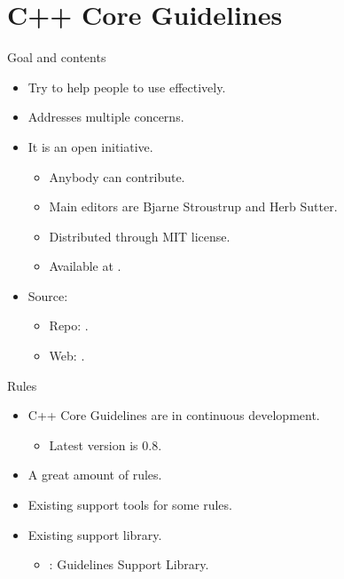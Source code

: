 \section{C++ Core Guidelines}

\begin{frame}[t]{Goal and contents}
\begin{itemize}
  \item Try to help people to use  effectively.

  \vfill
  \item Addresses multiple concerns.

  \vfill
  \item It is an open initiative.
    \begin{itemize}
      \item Anybody can contribute.
      \item Main editors are Bjarne Stroustrup and Herb Sutter.
      \item Distributed through MIT license.
      \item Available at .
    \end{itemize}

  \vfill
  \item Source:
    \begin{itemize}
      \item Repo: .
      \item Web: .
    \end{itemize}
\end{itemize}
\end{frame}

\begin{frame}[t]{Rules}
\begin{itemize}
  \item C++ Core Guidelines are in continuous development.
    \begin{itemize}
      \item Latest version is 0.8.
    \end{itemize}

  \vfill
  \item A great amount of rules.

  \vfill
  \item Existing support tools for some rules.

  \vfill
  \item Existing support library.
    \begin{itemize}
      \item {}: Guidelines Support Library.
    \end{itemize}
\end{itemize}
\end{frame}

